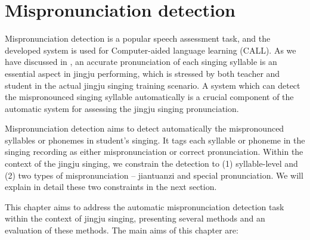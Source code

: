 \chapter{Mispronunciation detection}\label{chap:mispronunciation}
Mispronunciation detection is a popular speech assessment task, and the developed system is used for Computer-aided language learning (CALL). As we have discussed in , an accurate pronunciation of each singing syllable is an essential aspect in jingju performing, which is stressed by both teacher and student in the actual jingju singing training scenario. A system which can detect the mispronounced singing syllable automatically is a crucial component of the automatic system for assessing the jingju singing pronunciation.

Mispronunciation detection aims to detect automatically the mispronounced syllables or phonemes in student's singing. It tags each syllable or phoneme in the singing recording as either mispronunciation or correct pronunciation. Within the context of the jingju singing, we constrain the detection to (1) syllable-level and (2) two types of mispronunciation -- \gls{jiantuanzi} and special pronunciation. We will explain in detail these two constraints in the next section. 

This chapter aims to address the automatic mispronunciation detection task within the context of jingju singing, presenting several methods and an evaluation of these methods. The main aims of this chapter are:

